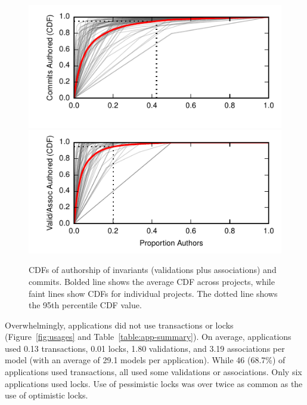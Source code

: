 \begin{figure}[h!]
  \newcommand{\skipht}{\\[-2em]}
\includegraphics[width=\figscale\columnwidth]{figs/commit-authorship-cdf.pdf}\vspace{-1.5em}
\includegraphics[width=\figscale\columnwidth]{figs/invariant-authorship-cdf.pdf}
\caption{CDFs of authorship of invariants (validations plus
  associations) and commits. Bolded line
  shows the average CDF across projects, while faint lines show CDFs
  for individual projects. The dotted line shows the 95th percentile
  CDF value. }
\label{fig:cdfs}
\end{figure}


Overwhelmingly, applications did not use transactions or locks
(Figure~\ref{fig:usages} and Table~\ref{table:app-summary}). On
average, applications used 0.13 transactions, 0.01 locks, 1.80
validations, and 3.19 associations per model (with an average of 29.1
models per application). While 46 (68.7\%) of applications used
transactions, all used some validations or associations. Only six
applications used locks. Use of pessimistic locks was over twice
as common as the use of optimistic locks.

